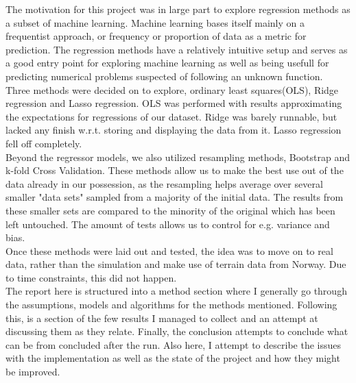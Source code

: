\documentclass[15pt comic sans]{revtex4-2}
\begin{document}
The motivation for this project was in large part to explore regression methods as a
subset of machine learning. Machine learning bases itself mainly on a frequentist approach,
or frequency or proportion of data as a metric for prediction. The regression methods have
a relatively intuitive setup and serves as a good entry point for exploring machine learning
as well as being usefull for predicting numerical problems suspected of following an unknown
function.\\
Three methods were decided on to explore, ordinary least squares(OLS), Ridge regression and
Lasso regression. OLS was performed with results approximating the expectations for regressions
of our dataset. Ridge was barely runnable, but lacked any finish w.r.t. storing and displaying the
data from it. Lasso regression fell off completely.\\
Beyond the regressor models, we also utilized resampling methods, Bootstrap and k-fold Cross Validation.
These methods allow us to make the best use out of the data already in our possession, as the resampling
helps average over several smaller "data sets" sampled from a majority of the initial data. The results
from these smaller sets are compared to the minority of the original which has been left untouched. The
amount of tests allows us to control for e.g. variance and bias.\\
Once these methods were laid out and tested, the idea was to move on to real data, rather than the simulation
and make use of terrain data from Norway. Due to time constraints, this did not happen.\\
The report here is structured into a method section where I generally go through the assumptions, models and
algorithms for the methods mentioned. Following this, is a section of the few results I managed to collect
and an attempt at discussing them as they relate. Finally, the conclusion attempts to conclude what can be
from concluded after the run. Also here, I attempt to describe the issues with the implementation as well
as the state of the project and how they might be improved.
\end{document}
